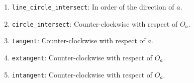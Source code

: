 \begin{enumerate}
\item \texttt{line\_circle\_intersect}: In order of the direction of $a$.
\item \texttt{circle\_intersect}: Counter-clockwise with respect of $O_a$.
\item \texttt{tangent}: Counter-clockwise with respect of $a$.
\item \texttt{extangent}: Counter-clockwise with respect of $O_a$.
\item \texttt{intangent}: Counter-clockwise with respect of $O_a$.
\end{enumerate}


